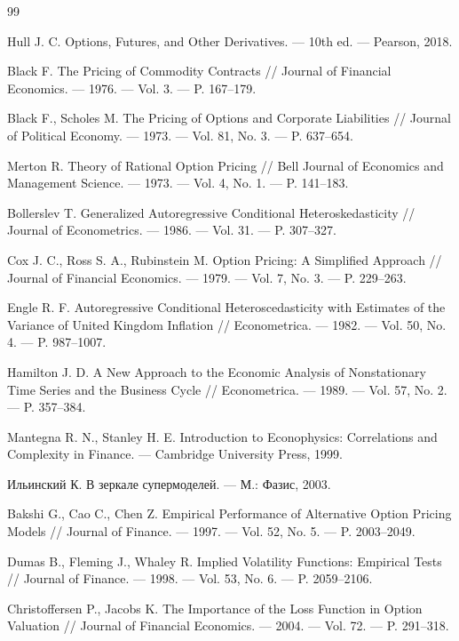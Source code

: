 \documentclass[11pt,a4paper]{article}
\begin{document}
\begin{thebibliography}{99}

Hull J. C. Options, Futures, and Other Derivatives. --- 10th ed. --- Pearson, 2018.

Black F. The Pricing of Commodity Contracts // Journal of Financial Economics. --- 1976. --- Vol. 3. --- P. 167--179.

Black F., Scholes M. The Pricing of Options and Corporate Liabilities // Journal of Political Economy. --- 1973. --- Vol. 81, No. 3. --- P. 637--654.

Merton R. Theory of Rational Option Pricing // Bell Journal of Economics and Management Science. --- 1973. --- Vol. 4, No. 1. --- P. 141--183.

Bollerslev T. Generalized Autoregressive Conditional Heteroskedasticity // Journal of Econometrics. --- 1986. --- Vol. 31. --- P. 307--327.

Cox J. C., Ross S. A., Rubinstein M. Option Pricing: A Simplified Approach // Journal of Financial Economics. --- 1979. --- Vol. 7, No. 3. --- P. 229--263.

Engle R. F. Autoregressive Conditional Heteroscedasticity with Estimates of the Variance of United Kingdom Inflation // Econometrica. --- 1982. --- Vol. 50, No. 4. --- P. 987--1007.

Hamilton J. D. A New Approach to the Economic Analysis of Nonstationary Time Series and the Business Cycle // Econometrica. --- 1989. --- Vol. 57, No. 2. --- P. 357--384.

Mantegna R. N., Stanley H. E. Introduction to Econophysics: Correlations and Complexity in Finance. --- Cambridge University Press, 1999.

Ильинский К. В зеркале супермоделей. --- М.: Фазис, 2003.

Bakshi G., Cao C., Chen Z. Empirical Performance of Alternative Option Pricing Models // Journal of Finance. --- 1997. --- Vol. 52, No. 5. --- P. 2003--2049.

Dumas B., Fleming J., Whaley R. Implied Volatility Functions: Empirical Tests // Journal of Finance. --- 1998. --- Vol. 53, No. 6. --- P. 2059--2106.

Christoffersen P., Jacobs K. The Importance of the Loss Function in Option Valuation // Journal of Financial Economics. --- 2004. --- Vol. 72. --- P. 291--318.


\end{thebibliography}
\end{document}
